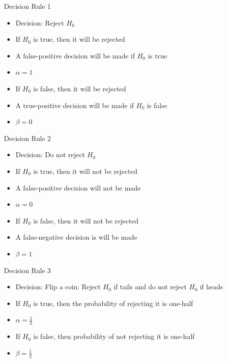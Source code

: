 \documentclass[xcolor=x11names,compress]{beamer}\usepackage[]{graphicx}\usepackage[]{color}
\begin{document}
\begin{frame}{Decision Rule 1}
  \begin{itemize}
  \item Decision: Reject $H_0$
  \item If $H_0$ is true, then it will be rejected
  \item A false-positive decision will be made if $H_0$ is true
  \item  $\alpha=1$
   \item If $H_0$ is false, then it will be rejected
  \item A true-positive decision will be made if $H_0$ is false
  \item  $\beta=0$
  \end{itemize}
\end{frame}


\begin{frame}{Decision Rule 2}
  \begin{itemize}
  \item Decision: Do not reject $H_0$
  \item If $H_0$ is true, then it will not be rejected
  \item A false-positive decision will not be made
  \item  $\alpha=0$
   \item If $H_0$ is false, then it will not be rejected
  \item A false-negative decision is will be made
  \item  $\beta=1$
  \end{itemize}
\end{frame}

\begin{frame}{Decision Rule 3}
  \begin{itemize}
  \item Decision: Flip a coin: Reject $H_0$ if tails and do not reject $H_0$ if heads
  \item If $H_0$ is true, then the probability of rejecting it is one-half
  \item  $\alpha=\frac{1}{2}$
   \item If $H_0$ is false, then probability of not rejecting it is one-half
  \item  $\beta=\frac{1}{2}$
  \end{itemize}
\end{frame}
\end{document}
